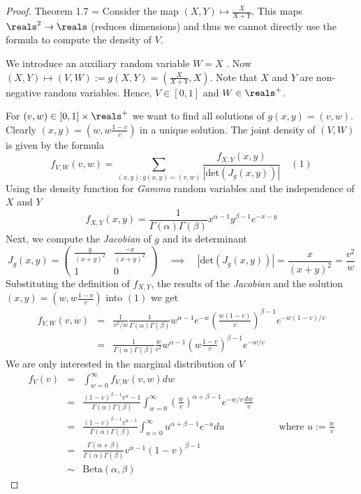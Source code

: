 \documentclass[11pt,a4paper]{article}
\begin{document}
  \begin{proof}{Theorem 1.7}
    \everymath={\displaystyle}
    Consider the map $(X,Y)\mapsto\frac{X}{X+Y}$. This maps $\reals^2\to\reals$ (reduces dimensions) and thus we cannot directly use the formula to compute the density of $V$.
    \par We introduce an auxiliary random variable $W=X$ . Now $(X,Y)\mapsto(V,W):=g(X,Y)=\left(\frac{X}{X+Y},X\right)$. Note that $X$ and $Y$ are non-negative random variables. Hence, $V\in[0,1]$ and $W\in\reals^+$.
    \par For $(v,w)\in[0,1]\times\reals^+$ we want to find all solutions of $g(x,y)=(v,w)$. Clearly $(x,y)=\left(w,w\frac{1-v}v\right)$ in a unique solution. The joint density of $(V,W)$ is given by the formula
    \[ f_{V,W}(v,w)=\sum_{(x,y):g(x,y)=(v,w)}\frac{f_{X,Y}(x,y)}{|\text{det}(J_g(x,y))|}\quad(1) \]
    Using the density function for \textit{Gamma} random variables and the independence of $X$ and $Y$
    \[ f_{X,Y}(x,y)=\frac1{\Gamma(\alpha)\Gamma(\beta)}x^{\alpha-1}y^{\beta-1}e^{-x-y} \]
    Next, we compute the \textit{Jacobian} of $g$ and its determinant
    \[ J_g(x,y)=\begin{pmatrix}\frac{y}{(x+y)^2}&\frac{-x}{(x+y)^2}\\1&0\end{pmatrix}\quad\implies\quad |\text{det}(J_g(x,y))|=\frac{x}{(x+y)^2}=\frac{v^2}w \]
    Substituting the definition of $f_{X,Y}$, the results of the \textit{Jacobian} and the solution $(x,y)=\left(w,w\frac{1-v}v\right)$ into $(1)$ we get
    \[\begin{array}{rcl}
      f_{V,W}(v,w)&=&\frac{1}{v^2/w}\frac1{\Gamma(\alpha)\Gamma(\beta)}w^{\alpha-1}e^{-w}\left(\frac{w(1-v)}{v}\right)^{\beta-1}e^{-w(1-v)/v}\\
      &=&\frac1{\Gamma(\alpha)\Gamma(\beta)}\frac{w}{v^2}w^{\alpha-1}\left(w\frac{1-v}v\right)^{\beta-1}e^{-w/v}
    \end{array}\]
    We are only interested in the marginal distribution of $V$
    \[\begin{array}{rclcl}
      f_V(v)&=&\int_{w=0}^\infty f_{V,W}(v,w)dw&\quad&\\
      &=&\frac{(1-v)^{\beta-1}v^{\alpha}-1}{\Gamma(\alpha)\Gamma(\beta)}\int_{w=0}^\infty\left(\frac{w}v\right)^{\alpha+\beta-1}e^{-w/v}\frac{dw}v\\
      &=&\frac{(1-v)^{\beta-1}v^{\alpha-1}}{\Gamma(\alpha)\Gamma(\beta)}\int_{u=0}^\infty u^{\alpha+\beta-1}e^{-u}du&&\text{where }u:=\frac{w}v\\
      &=&\frac{\Gamma(\alpha+\beta)}{\Gamma(\alpha)\Gamma(\beta)}v^{\alpha-1}(1-v)^{\beta-1}\\
      &\sim&\text{Beta}(\alpha,\beta)
    \end{array}\]
    \hfill\proved
  \end{proof}
\end{document}
